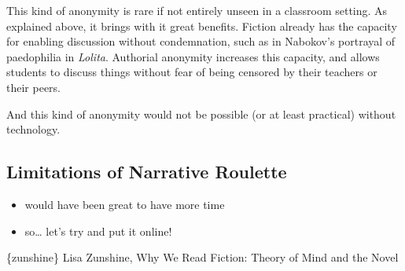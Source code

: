 This kind of anonymity is rare if not entirely unseen in a classroom
setting. As explained above, it brings with it great benefits. Fiction
already has the capacity for enabling discussion without condemnation,
such as in Nabokov's portrayal of paedophilia in \emph{Lolita}.
Authorial anonymity increases this capacity, and allows students to
discuss things without fear of being censored by their teachers or their
peers.

And this kind of anonymity would not be possible (or at least practical)
without technology.

\subsection{Limitations of Narrative Roulette}

\begin{itemize}
\item
  would have been great to have more time
\item
  so\ldots{} let's try and put it online!
\end{itemize}

{%
}
{%
\FL
\{zunshine\} Lisa Zunshine, Why We Read Fiction: Theory of Mind and
the Novel
\LL
}
